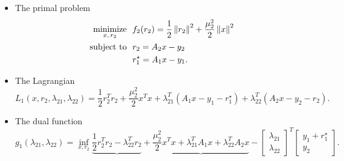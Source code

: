 \documentclass[12pt]{article}
\begin{document}
\begin{itemize}

\item The primal problem
  \begin{align}
    \begin{split}
      \mathop{\mbox{minimize}}_{x, \, r_2} \ \  & f_2(r_2) = \frac{1}{2}\left\lVert r_2\right\rVert^2 + \frac{\mu_2^2}{2}\left\lVert x\right\rVert^2\\
      \mbox{subject to} \ \  & r_2 = A_2x - y_2 \\
      & r_1^{\star} = A_1x - y_1.
    \end{split}
  \end{align}

\item The Lagrangian
  \[
  L_1(x,r_2,\lambda_{21},\lambda_{22}) = \frac{1}{2}r_2^Tr_2 + \frac{\mu_2^2}{2} x^Tx + \lambda_{21}^T(A_1x - y_1 - r_1^{\star}) + \lambda_{22}^T(A_2x - y_2 - r_2).
  \]

\item The dual function
%
\[
g_1(\lambda_{21}, \lambda_{22}) = \inf_{x,r_2} \underbrace{\frac{1}{2}r_2^Tr_2 - \lambda_{22}^Tr_2} + \underbrace{\frac{\mu_2^2}{2}x^Tx + \lambda_{21}^TA_1x + \lambda_{22}^TA_2x} -
\begin{bmatrix} \lambda_{21} \\ \lambda_{22} \end{bmatrix}^T \begin{bmatrix} y_1+r_1^{\star} \\ y_2 \end{bmatrix}.
\]


\end{itemize}
\end{document}
